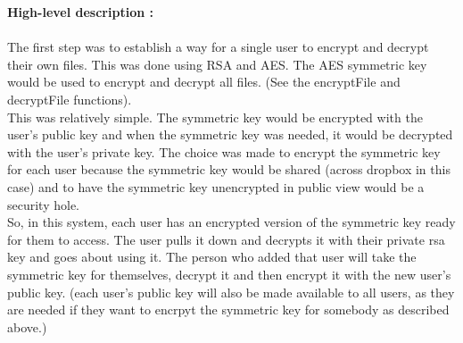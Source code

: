 \documentclass{report}
\begin{document}
    \textbf{High-level description :}\\\\
    The first step was to establish a way for a single user to encrypt and decrypt their own files. This was done using RSA and AES. The AES symmetric key would be used to encrypt and decrypt all files. (See the encryptFile and decryptFile functions).\\
    This was relatively simple. The symmetric key would be encrypted with the user's public key and when the symmetric key was needed, it would be decrypted with the user's private key. The choice was made to encrypt the symmetric key for each user because the symmetric key would be shared (across dropbox in this case) and to have the symmetric key unencrypted in public view would be a security hole.\\
     So, in this system, each user has an encrypted version of the symmetric key ready for them to access. The user pulls it down and decrypts it with their private rsa key and goes about using it. The person who added that user will take the symmetric key for themselves, decrypt it and then encrypt it with the new user's public key. (each user's public key will also be made available to all users, as they are needed if they want to encrpyt the symmetric key for somebody as described above.)\\\\
    
\end{document}
